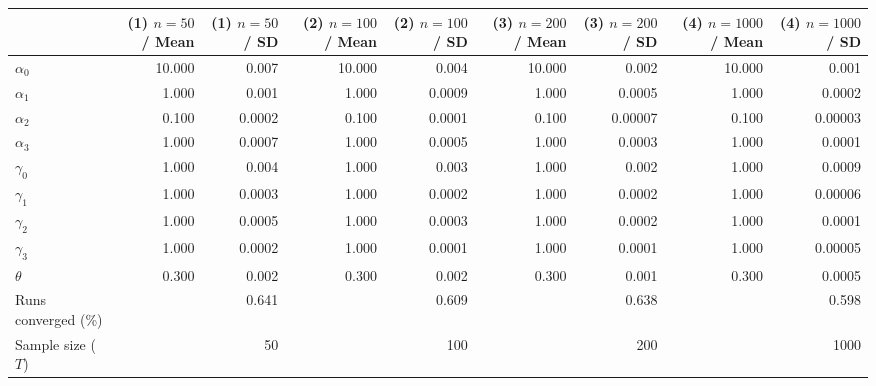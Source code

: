 
\begin{tabular}[t]{lrrrrrrrr}
\toprule
  & (1) $n=50$ / Mean & (1) $n=50$ / SD & (2) $n=100$ / Mean & (2) $n=100$ / SD & (3) $n=200$ / Mean & (3) $n=200$ / SD & (4) $n=1000$ / Mean & (4) $n=1000$ / SD\\
\midrule
$\alpha_{0}$ & 10.000 & 0.007 & 10.000 & 0.004 & 10.000 & 0.002 & 10.000 & 0.001\\
$\alpha_{1}$ & 1.000 & 0.001 & 1.000 & 0.0009 & 1.000 & 0.0005 & 1.000 & 0.0002\\
$\alpha_{2}$ & 0.100 & 0.0002 & 0.100 & 0.0001 & 0.100 & 0.00007 & 0.100 & 0.00003\\
$\alpha_{3}$ & 1.000 & 0.0007 & 1.000 & 0.0005 & 1.000 & 0.0003 & 1.000 & 0.0001\\
$\gamma_{0}$ & 1.000 & 0.004 & 1.000 & 0.003 & 1.000 & 0.002 & 1.000 & 0.0009\\
$\gamma_{1}$ & 1.000 & 0.0003 & 1.000 & 0.0002 & 1.000 & 0.0002 & 1.000 & 0.00006\\
$\gamma_{2}$ & 1.000 & 0.0005 & 1.000 & 0.0003 & 1.000 & 0.0002 & 1.000 & 0.0001\\
$\gamma_{3}$ & 1.000 & 0.0002 & 1.000 & 0.0001 & 1.000 & 0.0001 & 1.000 & 0.00005\\
$\theta$ & 0.300 & 0.002 & 0.300 & 0.002 & 0.300 & 0.001 & 0.300 & 0.0005\\
Runs converged (\%) &  & 0.641 &  & 0.609 &  & 0.638 &  & 0.598\\
Sample size ($T$) &  & 50 &  & 100 &  & 200 &  & 1000\\
\bottomrule
\end{tabular}
